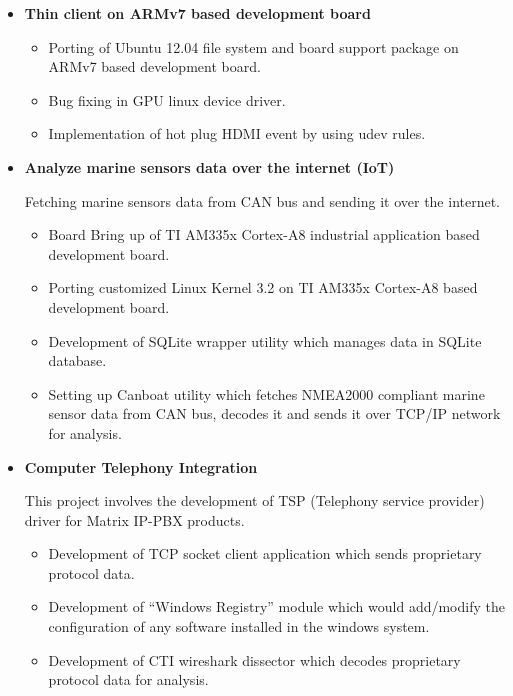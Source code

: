 \documentclass[letterpaper,10pt]{article}
\newcommand{\resitem}[1]{\item #1 \vspace{-2pt}}
\begin{document}
\begin{itemize}
\item
    \textbf{Thin client on ARMv7 based development board}
    
	\begin{itemize}
	    \resitem{Porting of Ubuntu 12.04 file system and board support package on ARMv7 based development board.}
	    
	    \resitem{Bug fixing in GPU linux device driver.}
	    
	    \resitem{Implementation of hot plug HDMI event by using udev rules.}
	    
	\end{itemize}
	
\item
    \textbf{Analyze marine sensors data over the internet (IoT)}
	
    Fetching marine sensors data from CAN bus and sending it over the internet.
    
	\begin{itemize}
	    \resitem{Board Bring up of TI AM335x Cortex-A8 industrial application based development board.}
	
	    \resitem{Porting customized Linux Kernel 3.2 on TI AM335x Cortex-A8 based development board.}
	    
	    \resitem{Development of SQLite wrapper utility which manages data in SQLite database.}
	    
	    \resitem{Setting up Canboat utility which fetches NMEA2000 compliant marine sensor data from CAN bus, decodes it and sends it over TCP/IP network for analysis.}

	\end{itemize}
	
\item
    \textbf{Computer Telephony Integration}
    
    This project involves the development of TSP (Telephony service provider) driver for Matrix IP-PBX products.
    
	\begin{itemize}
	    \resitem{Development of TCP socket client application which sends proprietary protocol data.}
	    
	    \resitem{Development of “Windows Registry” module which would add/modify the configuration of any software installed in the windows system.}
	    
	    \resitem{Development of CTI wireshark dissector which decodes proprietary protocol data for analysis.}
	    
	\end{itemize}

\end{itemize}
\end{document}
